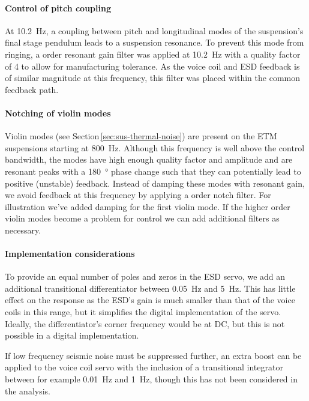 \paragraph{Control of pitch coupling}
At \SI{10.2}{\hertz}, a coupling between pitch and longitudinal modes of the suspension's final stage pendulum leads to a suspension resonance. To prevent this mode from ringing, a  order resonant gain filter was applied at \SI{10.2}{\hertz} with a quality factor of \num{4} to allow for manufacturing tolerance. As the voice coil and \gls{ESD} feedback is of similar magnitude at this frequency, this filter was placed within the common feedback path.

\paragraph{Notching of violin modes}
Violin modes (see Section\,\ref{sec:sus-thermal-noise}) are present on the \gls{ETM} suspensions starting at \SI{800}{\hertz}. Although this frequency is well above the control bandwidth, the modes have high enough quality factor and amplitude and are resonant peaks with a \SI{180}{\degree} phase change such that they can potentially lead to positive (unstable) feedback. Instead of damping these modes with resonant gain, we avoid feedback at this frequency by applying a  order notch filter. For illustration we've added damping for the first violin mode. If the higher order violin modes become a problem for control we can add additional filters as necessary.

\paragraph{Implementation considerations}
To provide an equal number of poles and zeros in the \gls{ESD} servo, we add an additional transitional differentiator between \SI{0.05}{\hertz} and \SI{5}{\hertz}. This has little effect on the response as the \gls{ESD}'s gain is much smaller than that of the voice coils in this range, but it simplifies the digital implementation of the servo. Ideally, the differentiator's corner frequency would be at \gls{DC}, but this is not possible in a digital implementation.

If low frequency seismic noise must be suppressed further, an extra boost can be applied to the voice coil servo with the inclusion of a transitional integrator between for example \SI{0.01}{\hertz} and \SI{1}{\hertz}, though this has not been considered in the analysis.

